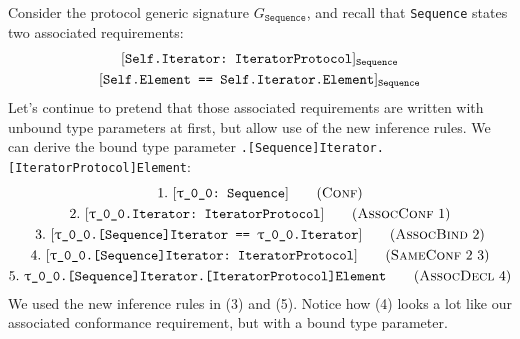 \documentclass[../generics]{subfiles}
\begin{document}
\begin{example}
Consider the protocol generic signature $G_\texttt{Sequence}$, and recall that \texttt{Sequence} states two associated requirements:
\begin{gather*}
\AssocConfReq{Self.Iterator}{IteratorProtocol}{Sequence}\\
\AssocSameReq{Self.Element}{Self.Iterator.Element}{Sequence}
\end{gather*}
Let's continue to pretend that those associated requirements are written with unbound type parameters at first, but allow use of the new inference rules. We can derive the bound type parameter \texttt{\rT.[Sequence]Iterator.[IteratorProtocol]Element}:
\begin{gather*}
\ConfStep{\rT}{Sequence}{1}\\
\AssocConfStep{1}{\rT.Iterator}{IteratorProtocol}{2}\\
\AssocBindStep{2}{\rT.[Sequence]Iterator}{\rT.Iterator}{3}\\
\SameConfStep{2}{3}{\rT.[Sequence]Iterator}{IteratorProtocol}{4}\\
\AssocDeclStep{4}{\rT.[Sequence]Iterator.[IteratorProtocol]Element}{5}
\end{gather*}
We used the new inference rules in (3) and (5). Notice how (4) looks a lot like our associated conformance requirement, but with a bound type parameter.


\end{example}
\end{document}
